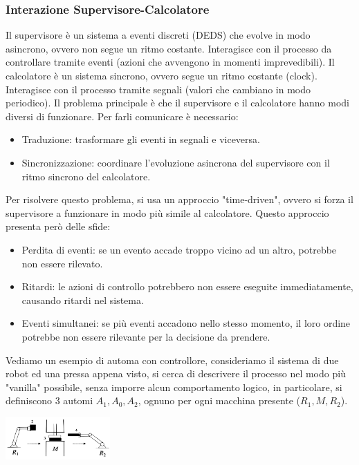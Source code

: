 \documentclass[10pt, letterpaper]{report}
\begin{document}
\subsubsection{Interazione Supervisore-Calcolatore}
Il supervisore
è un sistema a eventi discreti (DEDS) che evolve in modo asincrono, ovvero non segue un ritmo costante.
Interagisce con il processo da controllare tramite eventi (azioni che avvengono in momenti imprevedibili).\acc
Il calcolatore
è un sistema sincrono, ovvero segue un ritmo costante (clock).
Interagisce con il processo tramite segnali (valori che cambiano in modo periodico).
Il problema principale è che il supervisore e il calcolatore hanno modi diversi di funzionare. Per farli comunicare è necessario:
\begin{itemize}
   
    \item  Traduzione: trasformare gli eventi in segnali e viceversa.
    \item Sincronizzazione: coordinare l'evoluzione asincrona del supervisore con il ritmo sincrono del calcolatore.\end{itemize}
Per risolvere questo problema, si usa un approccio "time-driven", ovvero si forza il supervisore a funzionare in modo più simile al calcolatore.
Questo approccio presenta però delle sfide:
\begin{itemize}
    \item 
Perdita di eventi: se un evento accade troppo vicino ad un altro, potrebbe non essere rilevato.
\item Ritardi: le azioni di controllo potrebbero non essere eseguite immediatamente, causando ritardi nel sistema.
\item Eventi simultanei: se più eventi accadono nello stesso momento, il loro ordine potrebbe non essere rilevante per la decisione da prendere.
\end{itemize}
Vediamo un esempio di automa con controllore, consideriamo il sistema di due robot ed una pressa appena visto, si cerca di descrivere il processo nel modo più "vanilla" possibile, senza imporre alcun comportamento logico, in particolare, si definiscono 3 automi $A_1, A_0, A_2$, ognuno per ogni macchina presente ($R_1,M,R_2$).\begin{center}
    \includegraphics[width=0.3\textwidth]{images/robotPressa.pdf}
\end{center}
\end{document}
